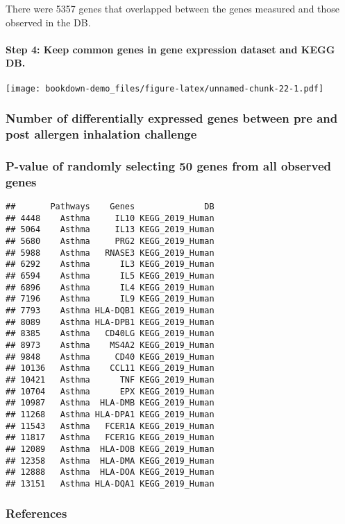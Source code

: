 \documentclass[]{book}
\let\oldparagraph\paragraph
\renewcommand{\paragraph}[1]{\oldparagraph{#1}\mbox{}}
\begin{document}
There were 5357 genes that overlapped between the genes measured and
those observed in the DB.

\paragraph{Step 4: Keep common genes in gene expression dataset and KEGG
DB.}\label{step-4-keep-common-genes-in-gene-expression-dataset-and-kegg-db.}

\texttt{[image: bookdown-demo\_files/figure-latex/unnamed-chunk-22-1.pdf]}

\subsubsection{Number of differentially expressed genes between pre and
post allergen inhalation
challenge}\label{number-of-differentially-expressed-genes-between-pre-and-post-allergen-inhalation-challenge}

\subsubsection{P-value of randomly selecting 50 genes from all observed
genes}\label{p-value-of-randomly-selecting-50-genes-from-all-observed-genes}

\begin{verbatim}
##       Pathways    Genes              DB
## 4448    Asthma     IL10 KEGG_2019_Human
## 5064    Asthma     IL13 KEGG_2019_Human
## 5680    Asthma     PRG2 KEGG_2019_Human
## 5988    Asthma   RNASE3 KEGG_2019_Human
## 6292    Asthma      IL3 KEGG_2019_Human
## 6594    Asthma      IL5 KEGG_2019_Human
## 6896    Asthma      IL4 KEGG_2019_Human
## 7196    Asthma      IL9 KEGG_2019_Human
## 7793    Asthma HLA-DQB1 KEGG_2019_Human
## 8089    Asthma HLA-DPB1 KEGG_2019_Human
## 8385    Asthma   CD40LG KEGG_2019_Human
## 8973    Asthma    MS4A2 KEGG_2019_Human
## 9848    Asthma     CD40 KEGG_2019_Human
## 10136   Asthma    CCL11 KEGG_2019_Human
## 10421   Asthma      TNF KEGG_2019_Human
## 10704   Asthma      EPX KEGG_2019_Human
## 10987   Asthma  HLA-DMB KEGG_2019_Human
## 11268   Asthma HLA-DPA1 KEGG_2019_Human
## 11543   Asthma   FCER1A KEGG_2019_Human
## 11817   Asthma   FCER1G KEGG_2019_Human
## 12089   Asthma  HLA-DOB KEGG_2019_Human
## 12358   Asthma  HLA-DMA KEGG_2019_Human
## 12888   Asthma  HLA-DOA KEGG_2019_Human
## 13151   Asthma HLA-DQA1 KEGG_2019_Human
\end{verbatim}

\subsubsection{References}\label{references-2}
\end{document}
